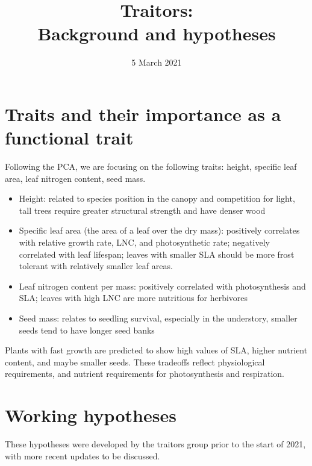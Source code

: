 \documentclass{article}\usepackage[]{graphicx}\usepackage[]{color}
\begin{document}
\title{{\huge Traitors:} \\ Background and hypotheses}
\date{5 March 2021}
\maketitle 

\section{Traits and their importance as a functional trait}

Following the PCA, we are focusing on the following traits: height, specific leaf area, leaf nitrogen content, seed mass.
\begin{itemize}
\item Height: related to species position in the canopy and competition for light, tall trees require greater structural strength and have denser wood
\item Specific leaf area (the area of a leaf over the dry mass): positively correlates with relative growth rate, LNC, and photosynthetic rate; negatively correlated with leaf lifespan; leaves with smaller SLA should be more frost tolerant with relatively smaller leaf areas.
\item Leaf nitrogen content per mass: positively correlated with photosynthesis and SLA; leaves with high LNC are more nutritious for herbivores  
\item Seed mass: relates to seedling survival, especially in the understory, smaller seeds tend to have longer seed banks
\end{itemize}

Plants with fast growth are predicted to show high values of SLA, higher nutrient content, and maybe smaller seeds. These tradeoffs reflect physiological requirements, and nutrient requirements for photosynthesis and respiration. 

\section{Working hypotheses}

These hypotheses were developed by the traitors group prior to the start of 2021, with more recent updates to be discussed. 
\end{document}
